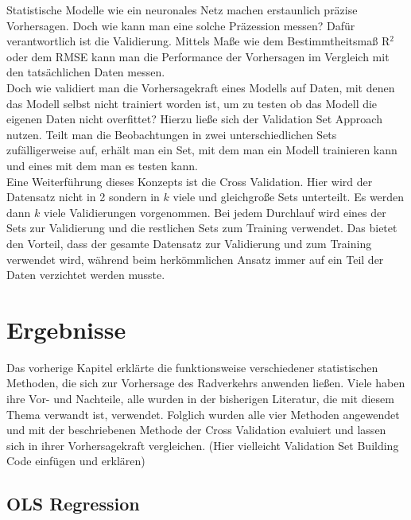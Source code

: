\documentclass[a4paper,12pt]{thesis}
\begin{document}
Statistische Modelle wie ein neuronales Netz machen erstaunlich präzise Vorhersagen. Doch wie kann man eine solche Präzession messen? Dafür verantwortlich ist die Validierung. Mittels Maße wie dem Bestimmtheitsmaß R$^2$ oder dem RMSE kann man die Performance der Vorhersagen im Vergleich mit den tatsächlichen Daten messen.\\
Doch wie validiert man die Vorhersagekraft eines Modells auf Daten, mit denen das Modell selbst nicht trainiert worden ist, um zu testen ob das Modell die eigenen Daten nicht overfittet? Hierzu ließe sich der Validation Set Approach nutzen. Teilt man die Beobachtungen in zwei unterschiedlichen Sets zufälligerweise auf, erhält man ein Set, mit dem man ein Modell trainieren kann und eines mit dem man es testen kann.\\
Eine Weiterführung dieses Konzepts ist die Cross Validation. Hier wird der Datensatz nicht in 2 sondern in $k$ viele und gleichgroße Sets unterteilt. Es werden dann $k$ viele Validierungen vorgenommen. Bei jedem Durchlauf wird eines der Sets zur Validierung und die restlichen Sets zum Training verwendet. Das bietet den Vorteil, dass der gesamte Datensatz zur Validierung und zum Training verwendet wird, während beim herkömmlichen Ansatz immer auf ein Teil der Daten verzichtet werden musste.

\chapter{Ergebnisse}

Das vorherige Kapitel erklärte die funktionsweise verschiedener statistischen Methoden, die sich zur Vorhersage des Radverkehrs anwenden ließen. Viele haben ihre Vor- und Nachteile, alle wurden in der bisherigen Literatur, die mit diesem Thema verwandt ist, verwendet. Folglich wurden alle vier Methoden angewendet und mit der beschriebenen Methode der Cross Validation evaluiert und lassen sich in ihrer Vorhersagekraft vergleichen. (Hier vielleicht Validation Set Building Code einfügen und erklären)

\section{OLS Regression}
\end{document}
